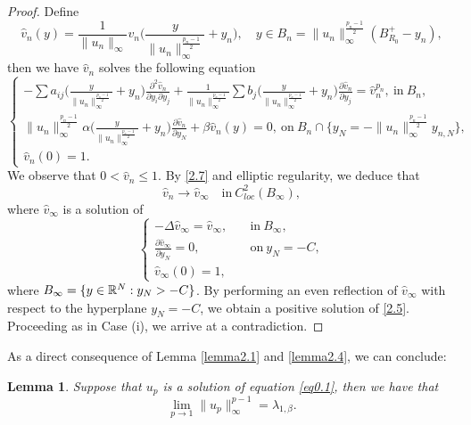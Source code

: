 \documentclass[12pt,reqno]{amsart}
\numberwithin{equation}{section}
\newtheorem{lemma}[theorem]{Lemma}
\theoremstyle{definition}
\def\R{{\mathfrak R}}
\def\R{\Bbb R}
\begin{document}
\begin{proof}
Define 
$$
\hat{v}_n (y)=\frac{1}{\|u_n\|_\infty}v_n\Big(\frac{y}{\|u_n\|_\infty^{\frac{p_n-1}{2}}}+y_n\Big),\quad y\in B_n=\|u_n\|_\infty^{\frac{p_n-1}{2}}(B_{R_0}^+-y_n),
$$
then we have $\hat{v}_n$ solves the following equation 
\begin{equation*}
\begin{cases}
\displaystyle -\sum a_{ij}\Big(\frac{y}{\|u_n\|_\infty^{\frac{p_n-1}{2}}}+y_n\Big)\frac{\partial^2 \hat{v}_n}{\partial y_i\partial y_j}+\frac{1}{\|u_n\|_\infty^{\frac{p_n-1}{2}}}\sum b_j\Big(\frac{y}{\|u_n\|_\infty^{\frac{p_n-1}{2}}}+y_n\Big) \frac{\partial \hat{v}_n}{\partial y_j}=\hat{v}_n^{p_n},\ \text{in}\ B_{n},\\
\displaystyle \|u_n\|_\infty^{\frac{p_n-1}{2}}\alpha\Big(\frac{y}{\|u_n\|_\infty^{\frac{p_n-1}{2}}}+y_n\Big)\frac{\partial \hat{v}_n}{\partial y_N}+\beta \hat{v}_n(y)=0, \ \text{on}\ B_n\cap \{y_N=-\|u_n\|_\infty^{\frac{p_n-1}{2}}y_{n, N}\},\\
\hat{v}_n(0)=1.
\end{cases}
\end{equation*}
We observe that $0<\hat{v}_n\le 1$. By \eqref{2.7} and elliptic regularity, we deduce that  
$$
\hat{v}_n\to \hat{v}_\infty\quad\text{in}\ C_{loc}^2(B_\infty),
$$
where $\hat{v}_\infty$ is a solution of 
\begin{equation*}
\begin{cases}
-\Delta \hat{v}_\infty=\hat{v}_\infty,\quad &\text{in}\ B_\infty,\\
\frac{\partial \hat{v}_\infty}{\partial y_N}=0, &\text{on}\ y_N=-C,\\
\hat{v}_\infty(0)=1,
\end{cases}
\end{equation*}
where $B_\infty=\{y\in\R^N : y_N>-C\}$.  
By performing an even reflection of $\hat{v}_\infty$ with respect to the hyperplane $y_N=-C$, we obtain a positive solution of \eqref{2.5}. Proceeding as in Case (i), we arrive at a contradiction. 
\end{proof}

As a direct consequence of Lemma \ref{lemma2.1} and \ref{lemma2.4}, we can conclude:

\begin{lemma}\label{lemma2.5}
Suppose that $u_p$ is a solution of equation \eqref{eq0.1}, then we have that 
$$
\lim_{p\to1} \|u_p\|_\infty^{p-1} = \lambda_{1,\beta}.
$$
\end{lemma}
\end{document}
